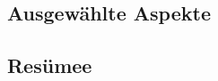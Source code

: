 \begin{spacing}{1}
\chapter{Ausgewählte Aspekte}\label{chapter:implementation}
\end{spacing}


\begin{spacing}{1}
\chapter{Resümee}
\end{spacing}



\newpage
{}
\setcounter{page}{\value{RPages}}

\glsnogroupskiptrue
\printglossary[title=Glossar,toctitle=Glossar] %
\listoffigures
\listoftables
\lstlistoflistings
\appendix
{}

